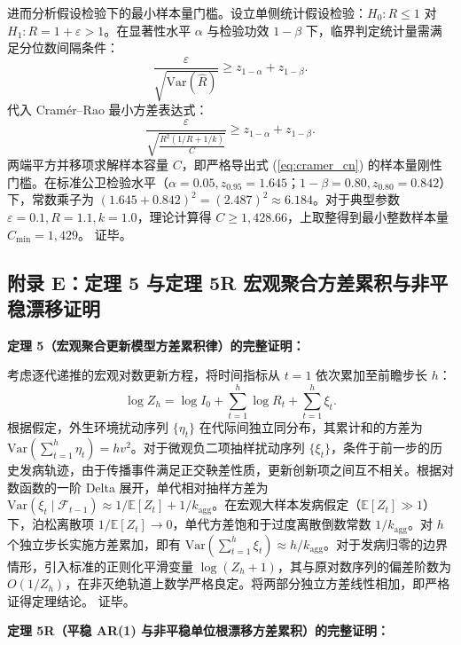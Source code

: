 \documentclass[11pt,a4paper]{article}
\theoremstyle{plain}
\theoremstyle{definition}
\begin{document}
进而分析假设检验下的最小样本量门槛。设立单侧统计假设检验：$H_0: R \le 1$ 对 $H_1: R = 1 + \varepsilon > 1$。在显著性水平 $\alpha$ 与检验功效 $1 - \beta$ 下，临界判定统计量需满足分位数间隔条件：
\begin{equation}
\frac{\varepsilon}{\sqrt{\text{Var}(\hat{R})}} \ge z_{1-\alpha} + z_{1-\beta}.
\end{equation}
代入 Cram\'er--Rao 最小方差表达式：
\begin{equation}
\frac{\varepsilon}{\sqrt{\frac{R^2(1/R + 1/k)}{C}}} \ge z_{1-\alpha} + z_{1-\beta}.
\end{equation}
两端平方并移项求解样本容量 $C$，即严格导出式 (\ref{eq:cramer_cn}) 的样本量刚性门槛。在标准公卫检验水平（$\alpha = 0.05, z_{0.95} = 1.645$；$1-\beta = 0.80, z_{0.80} = 0.842$）下，常数乘子为 $(1.645 + 0.842)^2 = (2.487)^2 \approx 6.184$。对于典型参数 $\varepsilon=0.1, R=1.1, k=1.0$，理论计算得 $C \ge 1{,}428.66$，上取整得到最小整数样本量 $C_{\min} = 1{,}429$。
证毕。

\subsection*{附录 E：定理 5 与定理 5R 宏观聚合方差累积与非平稳漂移证明}

\noindent\textbf{定理 5（宏观聚合更新模型方差累积律）的完整证明：}

考虑逐代递推的宏观对数更新方程，将时间指标从 $t=1$ 依次累加至前瞻步长 $h$：
\begin{equation}
\log Z_h = \log I_0 + \sum_{t=1}^h \log R_t + \sum_{t=1}^h \xi_t.
\end{equation}
根据假定，外生环境扰动序列 $\{\eta_t\}$ 在代际间独立同分布，其累计和的方差为 $\text{Var}(\sum_{t=1}^h \eta_t) = h v^2$。对于微观负二项抽样扰动序列 $\{\xi_t\}$，条件于前一步的历史发病轨迹，由于传播事件满足正交鞅差性质，更新创新项之间互不相关。根据对数函数的一阶 Delta 展开，单代相对抽样方差为 $\text{Var}(\xi_t \mid \mathcal{F}_{t-1}) \approx 1/\mathbb{E}[Z_t] + 1/k_{\text{agg}}$。在宏观大样本发病假定（$\mathbb{E}[Z_t] \gg 1$）下，泊松离散项 $1/\mathbb{E}[Z_t] \to 0$，单代方差饱和于过度离散倒数常数 $1/k_{\text{agg}}$。对 $h$ 个独立步长实施方差累加，即有 $\text{Var}(\sum_{t=1}^h \xi_t) \approx h/k_{\text{agg}}$。对于发病归零的边界情形，引入标准的正则化平滑变量 $\log(Z_h + 1)$，其与原对数序列的偏差阶数为 $O(1/Z_h)$，在非灭绝轨道上数学严格良定。将两部分独立方差线性相加，即严格证得定理结论。
证毕。

\vspace{0.8em}
\noindent\textbf{定理 5R（平稳 AR(1) 与非平稳单位根漂移方差累积）的完整证明：}
\end{document}
